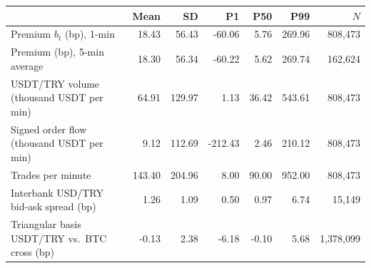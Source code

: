 \begin{tabular}{lrrrrrr}
\toprule
 & Mean & SD & P1 & P50 & P99 & $N$ \\
\midrule
Premium $b_t$ (bp), 1-min & 18.43 & 56.43 & -60.06 & 5.76 & 269.96 & 808,473 \\
Premium (bp), 5-min average & 18.30 & 56.34 & -60.22 & 5.62 & 269.74 & 162,624 \\
USDT/TRY volume (thousand USDT per min) & 64.91 & 129.97 & 1.13 & 36.42 & 543.61 & 808,473 \\
Signed order flow (thousand USDT per min) & 9.12 & 112.69 & -212.43 & 2.46 & 210.12 & 808,473 \\
Trades per minute & 143.40 & 204.96 & 8.00 & 90.00 & 952.00 & 808,473 \\
Interbank USD/TRY bid-ask spread (bp) & 1.26 & 1.09 & 0.50 & 0.97 & 6.74 & 15,149 \\
Triangular basis USDT/TRY vs.\ BTC cross (bp) & -0.13 & 2.38 & -6.18 & -0.10 & 5.68 & 1,378,099 \\
\bottomrule
\end{tabular}
